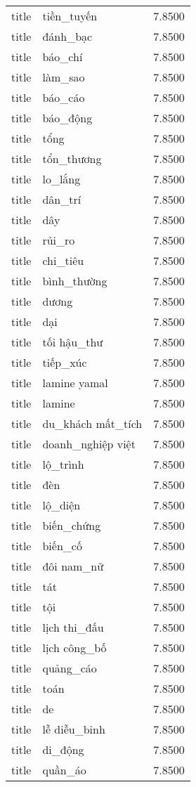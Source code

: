 \documentclass{article}
\begin{document}
\begin{tabular}{lll}
title & tiền\_tuyến & 7.8500\\
title & đánh\_bạc & 7.8500\\
title & báo\_chí & 7.8500\\
title & làm\_sao & 7.8500\\
title & báo\_cáo & 7.8500\\
title & báo\_động & 7.8500\\
title & tổng & 7.8500\\
title & tổn\_thương & 7.8500\\
title & lo\_lắng & 7.8500\\
title & dân\_trí & 7.8500\\
title & dây & 7.8500\\
title & rủi\_ro & 7.8500\\
title & chi\_tiêu & 7.8500\\
title & bình\_thường & 7.8500\\
title & dương & 7.8500\\
title & dại & 7.8500\\
title & tối hậu\_thư & 7.8500\\
title & tiếp\_xúc & 7.8500\\
title & lamine yamal & 7.8500\\
title & lamine & 7.8500\\
title & du\_khách mất\_tích & 7.8500\\
title & doanh\_nghiệp việt & 7.8500\\
title & lộ\_trình & 7.8500\\
title & đèn & 7.8500\\
title & lộ\_diện & 7.8500\\
title & biến\_chứng & 7.8500\\
title & biến\_cố & 7.8500\\
title & đôi nam\_nữ & 7.8500\\
title & tát & 7.8500\\
title & tội & 7.8500\\
title & lịch thi\_đấu & 7.8500\\
title & lịch công\_bố & 7.8500\\
title & quảng\_cáo & 7.8500\\
title & toán & 7.8500\\
title & de & 7.8500\\
title & lễ diễu\_binh & 7.8500\\
title & di\_động & 7.8500\\
title & quần\_áo & 7.8500\\

\end{tabular}
\end{document}
